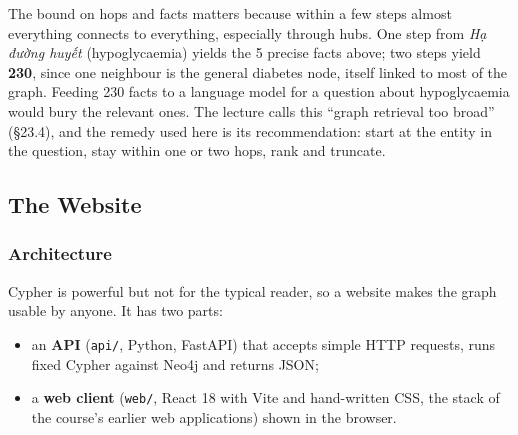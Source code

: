 \documentclass[11pt, a4paper]{article}
\newcommand{\code}[1]{\texttt{#1}}
\begin{document}
The bound on hops and facts matters because within a few steps almost everything connects to everything, especially through hubs. One step from \emph{Hạ đường huyết} (hypoglycaemia) yields the 5 precise facts above; two steps yield \textbf{230}, since one neighbour is the general diabetes node, itself linked to most of the graph. Feeding 230 facts to a language model for a question about hypoglycaemia would bury the relevant ones. The lecture calls this ``graph retrieval too broad'' (§23.4), and the remedy used here is its recommendation: start at the entity in the question, stay within one or two hops, rank and truncate.

\subsection{The Website}
\label{sec:website}

\subsubsection{Architecture}

Cypher is powerful but not for the typical reader, so a website makes the graph usable by anyone. It has two parts:
\begin{itemize}
    \item an \textbf{API} (\code{api/}, Python, FastAPI) that accepts simple HTTP requests, runs fixed Cypher against Neo4j and returns JSON;
    \item a \textbf{web client} (\code{web/}, React 18 with Vite and hand-written CSS, the stack of the course's earlier web applications) shown in the browser.
\end{itemize}

\begin{center}
\end{center}
\end{document}
